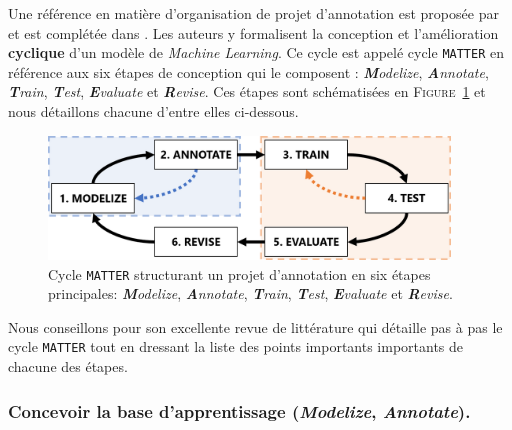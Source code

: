 		Une référence en matière d'organisation de projet d'annotation est proposée par \cite{pustejovsky-stubbs:2012:natural-language-annotation} et est complétée dans \cite{stubbs:2013:methodology-using-professional}.
		Les auteurs y formalisent la conception et l'amélioration \textbf{cyclique} d'un modèle de \textit{Machine Learning}.
		Ce cycle est appelé cycle \texttt{MATTER} en référence aux six étapes de conception qui le composent : \textit{\textbf{M}odelize}, \textit{\textbf{A}nnotate}, \textit{\textbf{T}rain}, \textit{\textbf{T}est}, \textit{\textbf{E}valuate} et \textit{\textbf{R}evise}.
		Ces étapes sont schématisées en \textsc{Figure~\ref{figure:2.2.1-ORGANISATION-ANNOTATION-ETAPES-CLES-MATTER}} et nous détaillons chacune d'entre elles ci-dessous.
		\begin{figure}[!htb]
			\centering
			\includegraphics[width=0.95\textwidth]{figures/etatdelart-pustejovsky-2012-cycle-matter-mama-tt}
			\caption{
				Cycle \texttt{MATTER} structurant un projet d'annotation en six étapes principales: \textit{\textbf{M}odelize}, \textit{\textbf{A}nnotate}, \textit{\textbf{T}rain}, \textit{\textbf{T}est}, \textit{\textbf{E}valuate} et \textit{\textbf{R}evise}.
			}
			\label{figure:2.2.1-ORGANISATION-ANNOTATION-ETAPES-CLES-MATTER}
		\end{figure}
		\begin{leftBarAuthorOpinion}
			Nous conseillons \cite{finlayson-erjavec:2016:overview-annotation-creation} pour son excellente revue de littérature qui détaille pas à pas le cycle \texttt{MATTER} tout en dressant la liste des points importants importants de chacune des étapes.
		\end{leftBarAuthorOpinion}
		
		\subsubsection{Concevoir la base d'apprentissage (\textit{\textbf{M}odelize}, \textit{\textbf{A}nnotate}).}
		\label{section:2.2.1.A-ORGANISATION-ANNOTATION-ETAPES-CLES-MODELIZE-ANNOTATE}
		
